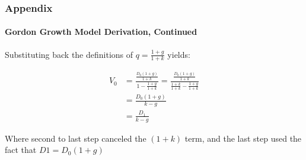 \documentclass{beamer}
\begin{document}
\begin{foundframe}[t]
    \frametitle{Appendix}
    \framesubtitle{Gordon Growth Model Derivation, Continued}

    Substituting back the definitions of $q = \frac{1+g}{1+k}$ yields:
    
    \begin{align*}
    V_0 &= \frac{\frac{D_0(1+g)}{1+k}}{1-\frac{1+g}{1+k}} = \frac{\frac{D_0(1+g)}{1+k}}{\frac{1+k}{1+k}-\frac{1+g}{1+k}}\\
    &= \frac{D_0(1+g)}{k-g}\\ 
    &= \frac{D_1}{k-g}
    \end{align*}
    
    Where second to last step canceled the $(1+k)$ term, and the last step used the fact that $D1 = D_0(1+g)$

\end{foundframe}
\end{document}
